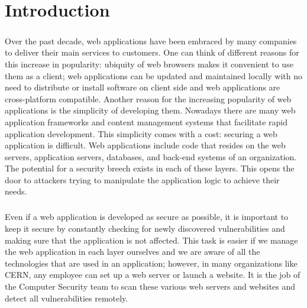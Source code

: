 \chapter{Introduction}
\label{introduction}
\thispagestyle{empty}
\paragraph{}
Over the past decade, web applications have been embraced by many companies to deliver their main services to customers. One can think of different reasons for this increase in popularity: ubiquity of web browsers makes it convenient to use them as a client; web applications can be updated and maintained locally with no need to distribute or install software on client side and web applications are cross-platform compatible.
Another reason for the increasing popularity of web applications is the simplicity of developing them. Nowadays there are many web application frameworks and content management systems that facilitate rapid application development. This simplicity comes with a cost: securing a web application is difficult. Web applications include code that resides on the web servers, application servers, databases, and back-end systems of an organization. The potential for a security breech exists in each of these layers. This opens the door to attackers trying to manipulate the application logic to achieve their needs\cite{secure_web}.
\paragraph{}
Even if a web application is developed as secure as possible, it is important to keep it secure by constantly checking for newly discovered vulnerabilities and making sure that the application is not affected. This task is easier if we manage the web application in each layer ourselves and we are aware of all the technologies that are used in an application; however, in many organizations like CERN, any employee can set up a web server or launch a website. It is the job of the Computer Security team to scan these various web servers and websites and detect all vulnerabilities remotely.
